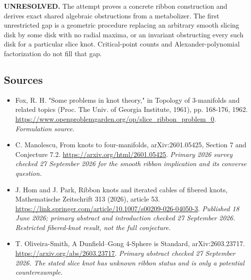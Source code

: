 \documentclass[11pt]{article}
\begin{document}
\textbf{UNRESOLVED.} The attempt proves a concrete ribbon construction and derives exact shared algebraic obstructions from a metabolizer. The first unrestricted gap is a geometric procedure replacing an arbitrary smooth slicing disk by some disk with no radial maxima, or an invariant obstructing every such disk for a particular slice knot. Critical-point counts and Alexander-polynomial factorization do not fill that gap.

\subsection{Sources}
\begin{itemize}
\item[S1]Fox, R. H. "Some problems in knot theory," in Topology of 3-manifolds and related topics (Proc. The Univ. of Georgia Institute, 1961), pp. 168-176, 1962.
\url{https://www.openproblemgarden.org/op/slice_ribbon_problem_0}.
\textit{Formulation source.}
\item[E1]C. Manolescu, From knots to four-manifolds, arXiv:2601.05425, Section 7 and Conjecture 7.2.
\url{https://arxiv.org/html/2601.05425}.
\textit{Primary 2026 survey checked 27 September 2026 for the smooth ribbon implication and its converse question.}
\item[E2]J. Hom and J. Park, Ribbon knots and iterated cables of fibered knots, Mathematische Zeitschrift 313 (2026), article 53.
\url{https://link.springer.com/article/10.1007/s00209-026-04050-3}.
\textit{Published 18 June 2026; primary abstract and introduction checked 27 September 2026. Restricted fibered-knot result, not the full conjecture.}
\item[E3]T. Oliveira-Smith, A Dunfield--Gong 4-Sphere is Standard, arXiv:2603.23717.
\url{https://arxiv.org/abs/2603.23717}.
\textit{Primary abstract checked 27 September 2026. The stated slice knot has unknown ribbon status and is only a potential counterexample.}
\end{itemize}
\end{document}
